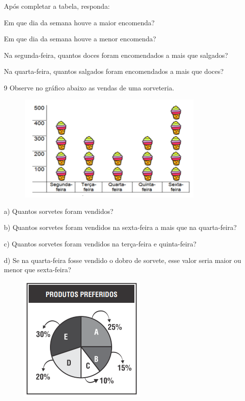 Após completar a tabela, responda:

\begin{escolha}
\item Em que dia da semana houve a maior encomenda? 
\item Em que dia da semana houve a menor encomenda? 
\item Na segunda-feira, quantos doces foram encomendados a mais que salgados? 
\item Na quarta-feira, quantos salgados foram encomendados a mais que doces? 
\end{escolha}

\num{9}  Observe no gráfico abaixo as vendas de uma sorveteria.

\begin{figure}[h]
\centering\includegraphics[width=3.7in,height=2.1in]{./imgSAEB_6_MAT/media/image87.png}
\end{figure}

a) Quantos sorvetes foram vendidos? 

b) Quantos sorvetes foram vendidos na sexta-feira a mais que na
quarta-feira? 

c) Quantos sorvetes foram vendidos na terça-feira e quinta-feira? 

d) Se na quarta-feira fosse vendido o dobro de sorvete, esse valor seria
maior ou menor que sexta-feira? 

\begin{figure}[h]
\centering\includegraphics[width=2.51181in,height=2.47708in]{./imgSAEB_6_MAT/media/image88.png}
\end{figure}

